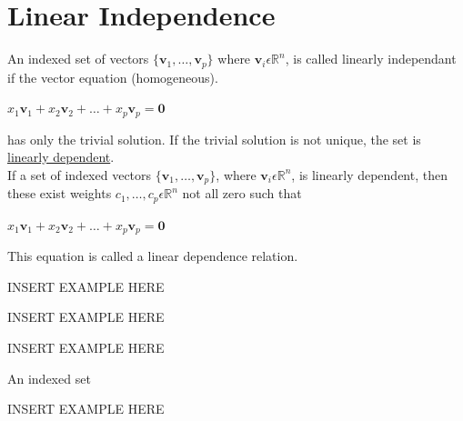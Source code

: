 \documentclass{report}
\begin{document}
\section{Linear Independence}
\begin{definition}
	An indexed set of vectors $\{ \mathbf{v}_1, \ldots, \mathbf{v}_p\}$ where $\mathbf{v}_i\epsilon \mathbb{R}^n$, is called linearly independant if the vector equation (homogeneous).
	\begin{center}
		$x_1\mathbf{v}_1 + x_2\mathbf{v}_2 + \ldots + x_p\mathbf{v}_p = \mathbf{0}$
	\end{center}
	has only the trivial solution. If the trivial solution is not unique, the set is \underline{linearly dependent}.\\
	If a set of indexed vectors $\{ \mathbf{v}_1, \ldots, \mathbf{v}_p\}$, where $\mathbf{v}_i\epsilon \mathbb{R}^n$, is linearly dependent, then these exist weights $c_1, \ldots, c_p \epsilon \mathbb{R}^n$ not all zero such that
	\begin{center}
		$x_1\mathbf{v}_1 + x_2\mathbf{v}_2 + \ldots + x_p\mathbf{v}_p = \mathbf{0}$
	\end{center}
	This equation is called a linear dependence relation.
\end{definition}
\begin{example}
	INSERT EXAMPLE HERE
\end{example}
\begin{example}
	INSERT EXAMPLE HERE
\end{example}
\begin{example}
	INSERT EXAMPLE HERE
\end{example}
\begin{theorem}
	An indexed set
\end{theorem}
\begin{example}
	INSERT EXAMPLE HERE
\end{example}
\end{document}
